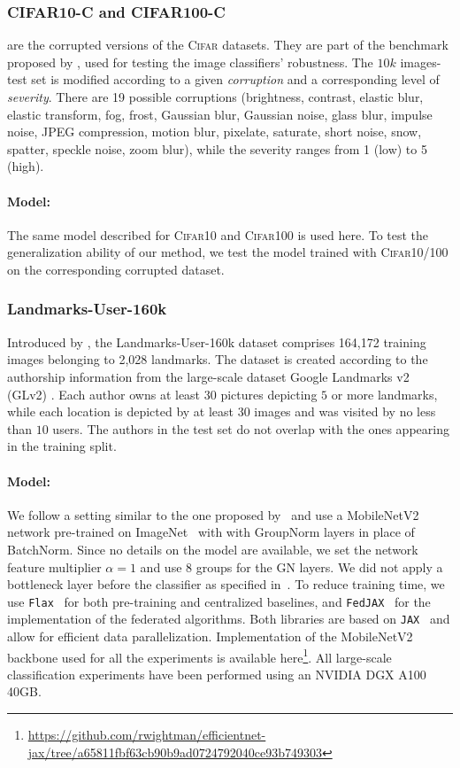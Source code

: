 \subsubsection{CIFAR10-C and CIFAR100-C} are the corrupted versions of the \textsc{Cifar} datasets. They are part of the benchmark proposed by \cite{hendrycks2019benchmarking}, used for testing the image classifiers' robustness. The $10k$ images-test set is modified according to a given \textit{corruption} and a corresponding level of \textit{severity}. There are 19 possible corruptions (brightness, contrast, elastic blur, elastic transform, fog, frost, Gaussian blur, Gaussian noise, glass blur, impulse noise, JPEG compression, motion blur, pixelate, saturate, short noise, snow, spatter, speckle noise, zoom blur), while the severity ranges from 1 (low) to 5 (high). 
\paragraph{Model:} The same model described for \textsc{Cifar10} and \textsc{Cifar100} is used here. To test the generalization ability of our method, we test the model trained with \textsc{Cifar10/100} on the corresponding corrupted dataset.
 
\subsubsection{Landmarks-User-160k} Introduced by \cite{hsu2020federated}, the Landmarks-User-160k dataset comprises 164,172 training images belonging to 2,028 landmarks. The dataset is created according to the authorship information from the large-scale dataset Google Landmarks v2 (GLv2) \cite{weyand2020google}. Each author owns at least 30 pictures depicting $5$ or more landmarks, while each location is depicted by at least 30 images and was visited by no less than $10$ users. The authors in the test set do not overlap with the ones appearing in the training split. 
\paragraph{Model:} 
We follow a setting similar to the one proposed by~\cite{hsu2020federated} and use a MobileNetV2~\cite{sandler2018mobilenetv2} network pre-trained on ImageNet~\cite{deng2009imagenet} with with GroupNorm layers in place of BatchNorm. Since no details on the model are available, we set the network feature multiplier $\alpha=1$ and use $8$ groups for the GN layers. We did not apply a bottleneck layer before the classifier as specified in~\cite{hsu2020federated}.
To reduce training time, we use \texttt{Flax}~\cite{flax2020github} for both pre-training and centralized baselines, and \texttt{FedJAX}~\cite{ro2021fedjax} for the implementation of the federated algorithms. Both libraries are based on \texttt{JAX}~\cite{jax2018github} and allow for efficient data parallelization. Implementation of the MobileNetV2 backbone used for all the experiments is available here\footnote{\url{https://github.com/rwightman/efficientnet-jax/tree/a65811fbf63cb90b9ad0724792040ce93b749303}}. All large-scale classification experiments have been performed using an NVIDIA DGX A100 40GB. 

